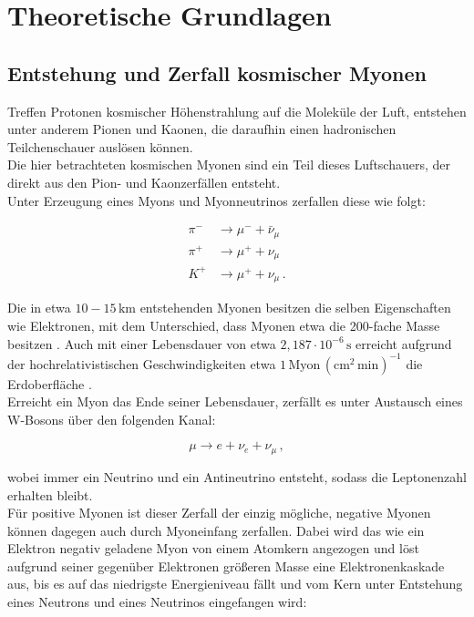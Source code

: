 \section{Theoretische Grundlagen}
\label{sec:theorie}

\subsection{Entstehung und Zerfall kosmischer Myonen}

Treffen Protonen kosmischer Höhenstrahlung auf die Moleküle der Luft, entstehen unter anderem Pionen und Kaonen, die daraufhin einen hadronischen Teilchenschauer auslösen können. \\
Die hier betrachteten kosmischen Myonen sind ein Teil dieses Luftschauers, der direkt aus den Pion- und Kaonzerfällen entsteht. \\

Unter Erzeugung eines Myons und Myonneutrinos zerfallen diese wie folgt:

\begin{align*}
    \pi^- &\rightarrow \mu^- + \bar{\nu}_\mu \\
    \pi^+ &\rightarrow \mu^+ + \nu_\mu \\
    K^+ &\rightarrow \mu^+ + \nu_\mu \,.
\end{align*}

Die in etwa $10 - 15 \,\unit{\kilo\meter}$ \cite{grup} entstehenden Myonen besitzen die selben Eigenschaften wie Elektronen, mit dem Unterschied, dass Myonen etwa die 200-fache Masse \cite{pdg} besitzen .
Auch mit einer Lebensdauer von etwa $2,187 \cdot 10^{-6} \,\unit{\second}$ \cite{pdg} erreicht aufgrund der hochrelativistischen Geschwindigkeiten etwa 
$1 \,\text{Myon} \, (\unit{\centi\meter}^2 \, \unit{\minute})^{-1}$ die Erdoberfläche \cite{grup}. \\

Erreicht ein Myon das Ende seiner Lebensdauer, zerfällt es unter Austausch eines W-Bosons über den folgenden Kanal:

\begin{equation*}
    \mu \rightarrow e + \nu_e + \nu_\mu \,,
\end{equation*}

wobei immer ein Neutrino und ein Antineutrino entsteht, sodass die Leptonenzahl erhalten bleibt. \\
Für positive Myonen ist dieser Zerfall der einzig mögliche, negative Myonen können dagegen auch durch Myoneinfang zerfallen.
Dabei wird das wie ein Elektron negativ geladene Myon von einem Atomkern angezogen und löst aufgrund seiner gegenüber Elektronen größeren Masse eine Elektronenkaskade aus,
bis es auf das niedrigste Energieniveau fällt und vom Kern unter Entstehung eines Neutrons und eines Neutrinos eingefangen wird:

